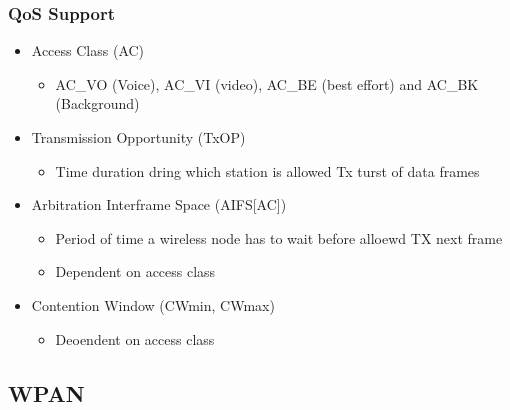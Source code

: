 \subsubsection{QoS Support}
\begin{itemize}
	\item Access Class (AC)
	\begin{itemize}
		\item AC\_VO (Voice), AC\_VI (video), AC\_BE (best effort) and
			AC\_BK (Background)
	\end{itemize}
	\item Transmission Opportunity (TxOP)
	\begin{itemize}
		\item Time duration dring which station is allowed Tx turst of
			data frames
	\end{itemize}
	\item Arbitration Interframe Space (AIFS[AC])
	\begin{itemize}
		\item Period of time a wireless node has to wait before alloewd
			TX next frame
		\item Dependent on access class
	\end{itemize}
	\item Contention Window (CWmin, CWmax)
	\begin{itemize}
		\item Deoendent on access class
	\end{itemize}
\end{itemize}
\subsection{WPAN}
